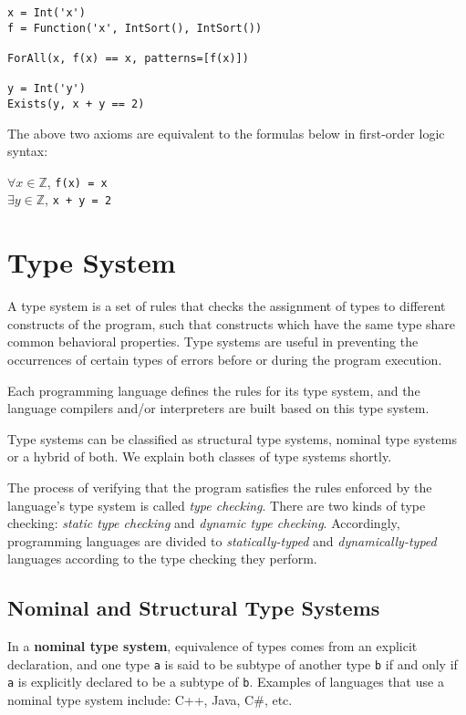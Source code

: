 \begin{lstlisting}
x = Int('x')
f = Function('x', IntSort(), IntSort())

ForAll(x, f(x) == x, patterns=[f(x)])

y = Int('y')
Exists(y, x + y == 2)
\end{lstlisting}

The above two axioms are equivalent to the formulas below in first-order logic syntax:\\
\begin{center}
	$\forall x\in \mathbb{Z}$, \lstinline|f(x) = x| \\
	$\exists y\in \mathbb{Z}$, \lstinline|x + y = 2|
\end{center}


\section{Type System}
A type system is a set of rules that checks the assignment of types to different constructs of the program, such that constructs which have the same type share common behavioral properties. Type systems are useful in preventing the occurrences of certain types of errors before or during the program execution.

Each programming language defines the rules for its type system, and the language compilers and/or interpreters are built based on this type system.

Type systems can be classified as structural type systems, nominal type systems or a hybrid of both. We explain both classes of type systems shortly.

The process of verifying that the program satisfies the rules enforced by the language's type system is called \textit{type checking}. There are two kinds of type checking: \textit{static type checking} and \textit{dynamic type checking}. Accordingly, programming languages are divided to \textit{statically-typed} and \textit{dynamically-typed} languages according to the type checking they perform.

\subsection{Nominal and Structural Type Systems}
In a \textbf{nominal type system}, equivalence of types comes from an explicit declaration, and one type \lstinline|a| is said to be subtype of another type \lstinline|b| if and only if \lstinline|a| is explicitly declared to be a subtype of \lstinline|b|. Examples of languages that use a nominal type system include: C++, Java, C\#, etc.\\

